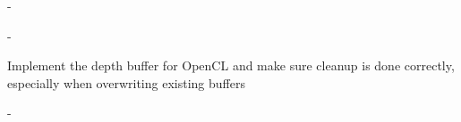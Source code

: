 \begin{DoxyRefList}
\item[\label{todo__todo000014}%
\hypertarget{todo__todo000014}{}%
File \hyperlink{vDataTypes_8h}{v\-Data\-Types.h} ]-\/  
\item[\label{todo__todo000015}%
\hypertarget{todo__todo000015}{}%
File \hyperlink{vRenderer_8h}{v\-Renderer.h} ]-\/  
\item[\label{todo__todo000016}%
\hypertarget{todo__todo000016}{}%
File \hyperlink{vRendererCL_8h}{v\-Renderer\-C\-L.h} ]Implement the depth buffer for Open\-C\-L and make sure cleanup is done correctly, especially when overwriting existing buffers  
\item[\label{todo__todo000017}%
\hypertarget{todo__todo000017}{}%
File \hyperlink{vRendererCuda_8h}{v\-Renderer\-Cuda.h} ]-\/ 
\end{DoxyRefList}